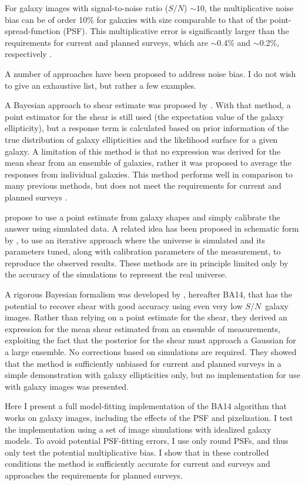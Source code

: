 \documentclass[usegraphicx,usenatbib]{mn2e}
\newcommand{\sn}{$S/N$}
\begin{document}
For galaxy images with signal-to-noise ratio (\sn) $\sim 10$, the
multiplicative noise bias can be of order 10\% for galaxies with size
comparable to that of the point-spread-function (PSF).  This multiplicative
error is significantly larger than the requirements for current and planned
surveys, which are $\sim$0.4\% and $\sim$0.2\%, respectively
\citep{HutererSystematics06}.

A number of approaches have been proposed to address noise bias. I do not wish
to give an exhaustive list, but rather a few examples.

A Bayesian approach to shear estimate was proposed by \cite{Miller07}.  With
that method, a point estimator for the shear is still used (the expectation
value of the galaxy ellipticity), but a response term is calculated based on
prior information of the true distribution of galaxy ellipticities and the
likelihood surface for a given galaxy.  A limitation of this method is that no
expression was derived for the mean shear from an ensemble of galaxies, rather
it was proposed to average the responses from individual galaxies.  This method
performs well in comparison to many previous methods, but does not meet the
requirements for current and planned surveys \citep{ba14}.

\cite{Zuntz13} propose to use a point estimate from galaxy shapes and simply
calibrate the answer using simulated data.  A related idea has been proposed in
schematic form by \cite{Refregier13}, to use an iterative approach where the
universe is simulated and its parameters tuned, along with calibration
parameters of the measurement, to reproduce the observed results.  These
methods are in principle limited only by the accuracy of the simulations to
represent the real universe.

A rigorous Bayesian formalism was developed by \cite{ba14}, hereafter BA14,
that has the potential to recover shear with good accuracy using even very low
\sn\ galaxy images.  Rather than relying on a point estimate for the shear,
they derived an expression for the mean shear estimated from an ensemble of
measurements, exploiting the fact that the posterior for the shear must
approach a Gaussian for a large ensemble.  No corrections based on simulations
are required.  They showed that the method is sufficiently unbiased for current
and planned surveys in a simple demonstration with galaxy ellipticities only,
but no implementation for use with galaxy images was presented.

Here I present a full model-fitting implementation of the BA14 algorithm that
works on galaxy images, including the effects of the PSF and pixelization.  I
test the implementation using a set of image simulations with idealized galaxy
models.  To avoid potential PSF-fitting errors, I use only round PSFs, and thus
only test the potential multiplicative bias. I show that in these controlled
conditions the method is sufficiently accurate for current and surveys and
approaches the requirements for planned surveys.
\end{document}
